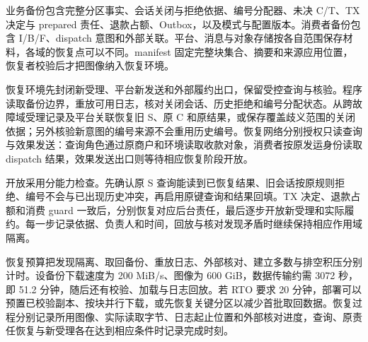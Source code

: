 
业务备份包含完整分区事实、会话关闭与拒绝依据、编号分配器、未决 C/T、TX 决定与 prepared 责任、退款占额、Outbox，以及模式与配置版本。消费者备份包含 I/B/F、dispatch 意图和外部关联。平台、消息与对象存储按各自范围保存材料，各域的恢复点可以不同。manifest 固定完整块集合、摘要和来源应用位置，恢复者校验后才把图像纳入恢复环境。

恢复环境先封闭新受理、平台新发送和外部履约出口，保留受控查询与核验。程序读取备份边界，重放可用日志，核对关闭会话、历史拒绝和编号分配状态。从跨故障域受理记录及平台关联恢复旧 S、原 C 和原结果，或保存覆盖歧义范围的关闭依据；另外核验新意图的编号来源不会重用历史编号。恢复网络分别授权只读查询与效果发送：查询角色通过原商户和环境读取收款对象，消费者按原发运身份读取 dispatch 结果，效果发送出口则等待相应恢复阶段开放。

开放采用分能力检查。先确认原 S 查询能读到已恢复结果、旧会话按原规则拒绝、编号不会与已出现历史冲突，再启用原键查询和结果回填。TX 决定、退款占额和消费 guard 一致后，分别恢复对应后台责任，最后逐步开放新受理和实际履约。每一步记录依据、负责人和时间，回放与核对发现矛盾时继续保持相应作用域隔离。

恢复预算把发现隔离、取回备份、重放日志、外部核对、建立多数与排空积压分别计时。设备份下载速度为 200 MiB/s、图像为 600 GiB，数据传输约需 3072 秒，即 51.2 分钟，随后还有校验、加载与日志回放。若 RTO 要求 20 分钟，部署可以预置已校验副本、按块并行下载，或先恢复关键分区以减少首批取回数据。恢复过程分别记录所用图像、实际读取字节、日志起止位置和外部核对进度，查询、原责任恢复与新受理各在达到相应条件时记录完成时刻。
